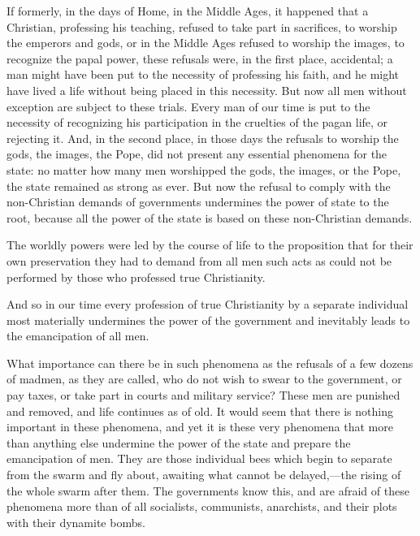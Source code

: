 \documentclass{book}
\begin{document}
If formerly, in the days of Home, in the Middle Ages, it happened that a Christian, professing his teaching, refused to take part in sacrifices, to worship the emperors and gods, or in the Middle Ages refused to worship the images, to recognize the papal power, these refusals were, in the first place, accidental; a man might have been put to the necessity of professing his faith, and he might have lived a life without being placed in this necessity. But now all men without exception are subject to these trials. Every man of our time is put to the necessity of recognizing his participation in the cruelties of the pagan life, or rejecting it. And, in the second place, in those days the refusals to worship the gods, the images, the Pope, did not present any essential phenomena for the state: no matter how many men worshipped the gods, the images, or the Pope, the state remained as strong as ever. But now the refusal to comply with the non-Christian demands of governments undermines the power of state to the root, because all the power of the state is based on these non-Christian demands.

The worldly powers were led by the course of life to the proposition that for their own preservation they had to demand from all men such acts as could not be performed by those who professed true Christianity.

And so in our time every profession of true Christianity by a separate individual most materially undermines the power of the government and inevitably leads to the emancipation of all men.

What importance can there be in such phenomena as the refusals of a few dozens of madmen, as they are called, who do not wish to swear to the government, or pay taxes, or take part in courts and military service? These men are punished and removed, and life continues as of old. It would seem that there is nothing important in these phenomena, and yet it is these very phenomena that more than anything else undermine the power of the state and prepare the emancipation of men. They are those individual bees which begin to separate from the swarm and fly about, awaiting what cannot be delayed,—the rising of the whole swarm after them. The governments know this, and are afraid of these phenomena more than of all socialists, communists, anarchists, and their plots with their dynamite bombs.
\end{document}
